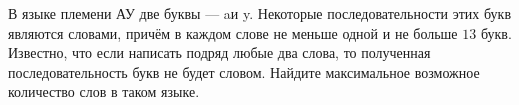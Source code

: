 В языке племени АУ две буквы --- \guillemotleft a\guillemotright и \guillemotleft y\guillemotright. Некоторые последовательности этих букв являются словами, причём в каждом слове не меньше одной и не больше $13$ букв. Известно, что если написать подряд любые два слова, то полученная последовательность букв не будет словом. Найдите максимальное возможное количество слов в таком языке.